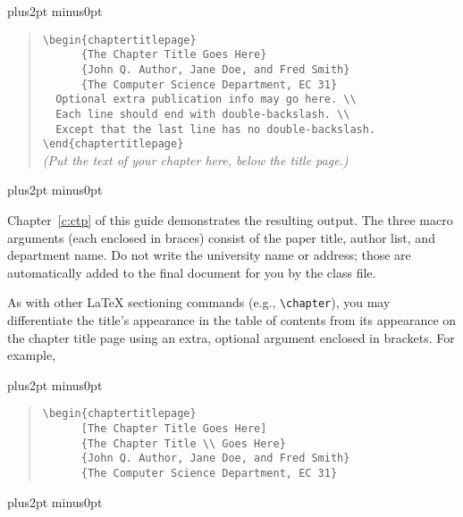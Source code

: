 \documentclass[doublespacing]{utdthesis}
\newenvironment{exampleclasscode}
 {\parindent=1cm\vskip0pt plus2pt minus0pt\begin{verse}}
 {\end{verse}\vskip0pt plus2pt minus0pt}
\begin{document}
\begin{exampleclasscode}
\verb|\begin{chaptertitlepage}| \\
\verb|      {The Chapter Title Goes Here}| \\
\verb|      {John Q. Author, Jane Doe, and Fred Smith}| \\
\verb|      {The Computer Science Department, EC 31}| \\
\verb|  Optional extra publication info may go here. \\| \\
\verb|  Each line should end with double-backslash. \\| \\
\verb|  Except that the last line has no double-backslash.| \\
\verb|\end{chaptertitlepage}| \\[5pt]
\textit{(Put the text of your chapter here, below the title page.)}
\end{exampleclasscode}

\noindent
Chapter~\ref{c:ctp} of this guide demonstrates the resulting output.
The three macro arguments (each enclosed in braces) consist of the paper title,
author list, and department name.
Do not write the university name or address; those are automatically added
to the final document for you by the class file.

As with other \LaTeX{} sectioning commands (e.g., \verb|\chapter|), you may
differentiate the title's appearance in the table of contents from its
appearance on the chapter title page using an extra, optional argument
enclosed in brackets.
For example,

\begin{exampleclasscode}
\verb|\begin{chaptertitlepage}| \\
\verb|      [The Chapter Title Goes Here]| \\
\verb|      {The Chapter Title \\ Goes Here}| \\
\verb|      {John Q. Author, Jane Doe, and Fred Smith}| \\
\verb|      {The Computer Science Department, EC 31}| \\
\end{exampleclasscode}
\end{document}
